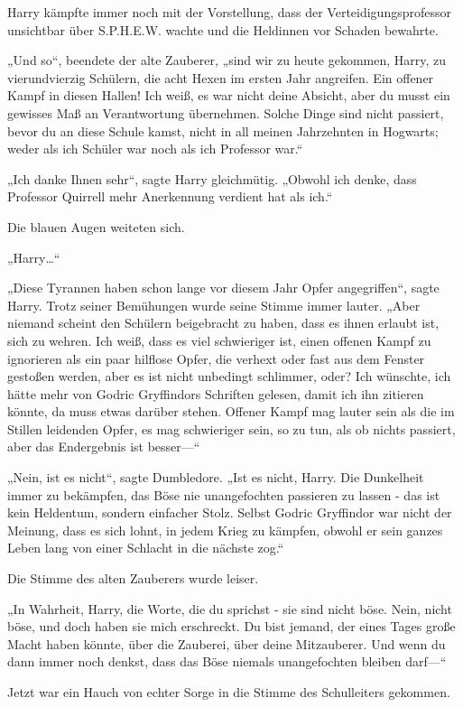 {Harry kämpfte immer noch mit der Vorstellung, dass der Verteidigungsprofessor unsichtbar über S.P.H.E.W. wachte und die Heldinnen vor Schaden bewahrte.

„Und so“, beendete der alte Zauberer, „sind wir zu heute gekommen, Harry, zu vierundvierzig Schülern, die acht Hexen im ersten Jahr angreifen. Ein offener Kampf in diesen Hallen! Ich weiß, es war nicht deine Absicht, aber du musst ein gewisses Maß an Verantwortung übernehmen. Solche Dinge sind nicht passiert, bevor du an diese Schule kamst, nicht in all meinen Jahrzehnten in Hogwarts; weder als ich Schüler war noch als ich Professor war.“

„Ich danke Ihnen sehr“, sagte Harry gleichmütig. „Obwohl ich denke, dass Professor Quirrell mehr Anerkennung verdient hat als ich.“

Die blauen Augen weiteten sich.

„Harry…“

„Diese Tyrannen haben schon lange vor diesem Jahr Opfer angegriffen“, sagte Harry. Trotz seiner Bemühungen wurde seine Stimme immer lauter. „Aber niemand scheint den Schülern beigebracht zu haben, dass es ihnen erlaubt ist, sich zu wehren. Ich weiß, dass es viel schwieriger ist, einen offenen Kampf zu ignorieren als ein paar hilflose Opfer, die verhext oder fast aus dem Fenster gestoßen werden, aber es ist nicht unbedingt schlimmer, oder? Ich wünschte, ich hätte mehr von Godric Gryffindors Schriften gelesen, damit ich ihn zitieren könnte, da muss etwas darüber stehen. Offener Kampf mag lauter sein als die im Stillen leidenden Opfer, es mag schwieriger sein, so zu tun, als ob nichts passiert, aber das Endergebnis ist besser—“

„Nein, ist es nicht“, sagte Dumbledore. „Ist es nicht, Harry. Die Dunkelheit immer zu bekämpfen, das Böse nie unangefochten passieren zu lassen - das ist kein Heldentum, sondern einfacher Stolz. Selbst Godric Gryffindor war nicht der Meinung, dass es sich lohnt, in jedem Krieg zu kämpfen, obwohl er sein ganzes Leben lang von einer Schlacht in die nächste zog.“

Die Stimme des alten Zauberers wurde leiser.

„In Wahrheit, Harry, die Worte, die du sprichst - sie sind nicht böse. Nein, nicht böse, und doch haben sie mich erschreckt. Du bist jemand, der eines Tages große Macht haben könnte, über die Zauberei, über deine Mitzauberer. Und wenn du dann immer noch denkst, dass das Böse niemals unangefochten bleiben darf—“

Jetzt war ein Hauch von echter Sorge in die Stimme des Schulleiters gekommen.

}
